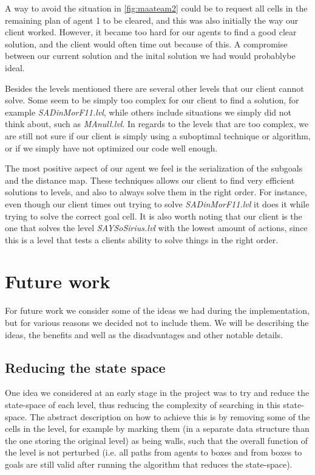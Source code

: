 \documentclass[letterpaper]{article}
\begin{document}
A way to avoid the situation in \ref{fig:maateam2} could be to request all cells in the remaining plan of agent 1 to be cleared, and this was also initially the way our client worked. However, it became too hard for our agents to find a good clear solution, and the client would often time out because of this. A compromise between our current solution and the inital solution we had would probablybe ideal.

Besides the levels mentioned there are several other levels that our client cannot solve. Some seem to be simply too complex for our client to find a solution, for example \textit{SADinMorF11.lvl}, while others include situations we simply did not think about, such as \textit{MAnull.lvl}. In regards to the levels that are too complex, we are still not sure if our client is simply using a suboptimal technique or algorithm, or if we simply have not optimized our code well enough.

The most positive aspect of our agent we feel is the serialization of the subgoals and the distance map. These techniques allows our client to find very efficient solutions to levels, and also to always solve them in the right order. For instance, even though our client times out trying to solve \textit{SADinMorF11.lvl} it does it while trying to solve the correct goal cell. It is also worth noting that our client is the one that solves the level \textit{SAYSoSirius.lvl} with the lowest amount of actions, since this is a level that tests a clients ability to solve things in the right order.

\section{Future work}
For future work we consider some of the ideas we had during the implementation, but for various reasons we decided not to include them. We will be describing the ideas, the benefits and well as the disadvantages and other notable details.

\subsection{Reducing the state space}
One idea we considered at an early stage in the project was to try and reduce the state-space of each level, thus reducing the complexity of searching in this state-space. The abstract description on how to achieve this is by removing some of the cells in the level, for example by marking them (in a separate data structure than the one storing the original level) as being walls, such that the overall function of the level is not perturbed (i.e. all paths from agents to boxes and from boxes to goals are still valid after running the algorithm that reduces the state-space).
\end{document}
